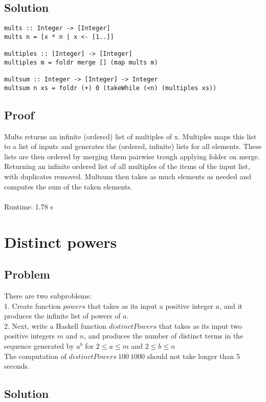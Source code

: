 \documentclass[a4paper,11pt]{article}
\begin{document}
\subsection{Solution}

\begin{lstlisting}
mults :: Integer -> [Integer]
mults n = [x * n | x <- [1..]]

multiples :: [Integer] -> [Integer]
multiples m = foldr merge [] (map mults m)

multsum :: Integer -> [Integer] -> Integer
multsum n xs = foldr (+) 0 (takeWhile (<n) (multiples xs))
\end{lstlisting}

\subsection{Proof}

Mults returns an infinite (ordered) list of multiples of x. Multiples maps this list to a list of inputs and generates the (ordered, infinite) lists for all elements. These lists are then ordered by merging them pairwise trough applying folder on merge. Returning an infinite ordered list of all multiples of the items of the input list, with duplicates removed. Multsum then takes as much elements as needed and computes the sum of the taken elements.\\
\\
Runtime: 1.78 s

\section{Distinct powers}
\subsection{Problem}
There are two subproblems:\\
1. Create function $powers$ that takes as its input a positive integer $a$, and it produces the infinite
list of powers of $a$.\\
2. Next, write a Haskell function $distinctPowers$ that takes as its input two positive integers $m$ and
$n$, and produces the number of distinct terms in the sequence generated by $a^b$ for $2 \leq a \leq m$ and $2 \leq b \leq n$\\
The computation of $distinctPowers\: 100\: 1000$ should not take longer than 5 seconds.
\subsection{Solution}
\end{document}
